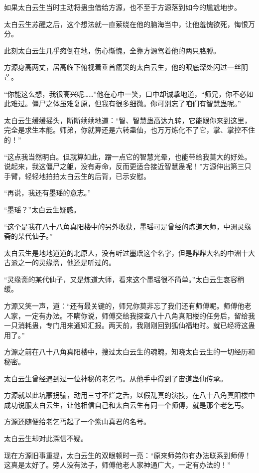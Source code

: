 \begin{this_body}
如果太白云生当时主动将蛊虫借给方源，也不至于方源落到如今的尴尬地步。

太白云生苏醒之后，这个想法就一直萦绕在他的脑海当中，让他羞愧欲死，悔恨万分。

此刻太白云生几乎瘫倒在地，伤心惭愧，全靠方源驾着他的两只胳膊。

方源身高两丈，居高临下俯视着垂首痛哭的太白云生，他的眼底深处闪过一丝阴芒。

“你能这么想，我很高兴呢……”他在心中一笑，口中却诚挚地道，“师兄，你不必如此难过。僵尸之体虽难复原，但我有很多细微。你可别忘了咱们有智慧蛊呢。”

太白云生缓缓摇头，断断续续地道：“智、智慧蛊高达九转，它能跟你来到这里，完全是求生本能。师弟，你就算还是六转蛊仙，也万万炼化不了它，掌、掌控不住的！”

“这点我当然明白。但就算如此，蹭一点它的智慧光晕，也能带给我莫大的好处。说起来，我这僵尸之躯，没有寿命，反而更适合接近智慧蛊呢！”方源伸出第三只手臂，轻轻地拍拍太白云生的后背，已示安慰。

“再说，我还有墨瑶的意志。”

“墨瑶？”太白云生疑惑。

“这个是我在八十八角真阳楼中的另外收获，墨瑶可是曾经的炼道大师，中洲灵缘斋的某代仙子。”

太白云生是地地道道的北原人，没有听过墨瑶这个名字，但是鼎鼎大名的中洲十大古派之一的灵缘斋，他还是听过的。

“灵缘斋的某代仙子，又是炼道大师，看来这个墨瑶很不简单。”太白云生哀容稍缓。

方源又笑一声，道：“还有最关键的，师兄你莫非忘了我们还有师傅呢。师傅他老人家，一定有办法。不瞒你说，师傅交给我探查八十八角真阳楼的任务后，留给我一只消耗蛊，专门用来通知汇报。两天前，我刚刚回到狐仙福地时。就已经将这蛊用了。”

方源之前在八十八角真阳楼中，搜过太白云生的魂魄，知晓太白云生的一切经历和秘密。

太白云生曾经遇到过一位神秘的老乞丐。从他手中得到了宙道蛊仙传承。

方源就以此坑蒙拐骗，动用三寸不烂之舌，以假乱真的演技，在八十八角真阳楼中成功说服太白云生，让他相信自己和太白云生有同一个师傅，就是那个老乞丐。

方源还随便给老乞丐起了一个紫山真君的名号。

太白云生却对此深信不疑。

现在方源旧事重提，太白云生的双眼顿时一亮：“原来师弟你有办法联系到师傅！这真是太好了。旁人没有法子，师傅他老人家神通广大，一定有办法的！”


\end{this_body}
